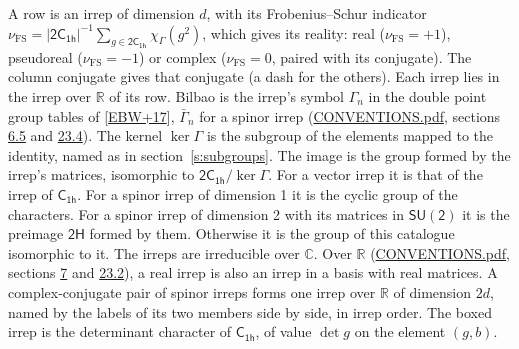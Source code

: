 \documentclass[10pt,a4paper]{article}
\numberwithin{equation}{section}
\newcommand{\grp}[1]{\mathsf{#1}}
\newcommand{\irchar}[1]{\chi_{#1}}
\newcommand{\fsind}{\nu_{\mathrm{FS}}}
\begin{document}
\leavevmode\label{n:index.frobenius}\label{n:head.irrep}\label{n:head.reality}A row is an irrep of dimension $d$, with its Frobenius--Schur indicator $\fsind = |\grp{2C_{1h}}|^{-1}\allowbreak\sum_{g\in\grp{2C_{1h}}}\irchar{\Gamma}(g^2)$, which gives its reality: real ($\fsind = +1$), pseudoreal ($\fsind = -1$) or complex ($\fsind = 0$, paired with its conjugate). \label{n:head.conjugate}The column conjugate gives that conjugate (a dash for the others). \label{n:head.over.real}Each irrep lies in the irrep over $\mathbb{R}$ of its row. \label{n:head.bilbao}\label{n:irrep.alias.gamma}Bilbao is the irrep's symbol $\Gamma_n$ in the double point group tables of [\href{../../../REFERENCES.pdf\#ref.EBW+17}{EBW+17}], $\bar{\Gamma}_n$ for a spinor irrep (\href{../../CONVENTIONS.pdf}{CONVENTIONS.pdf}, sections \href{../../../rotation/CONVENTIONS.pdf\#conv.6.5}{6.5} and \href{../../CONVENTIONS.pdf\#conv.23.4}{23.4}). \label{n:head.kernel}The kernel $\ker\Gamma$ is the subgroup of the elements mapped to the identity, named as in section~\ref{s:subgroups}. \label{n:head.image}The image is the group formed by the irrep's matrices, isomorphic to $\grp{2C_{1h}}/\ker\Gamma$. For a vector irrep it is that of the irrep of \href{../../../rotation/data/pdf/C1h.pdf}{$\grp{C_{1h}}$}. For a spinor irrep of dimension 1 it is the cyclic group of the characters. For a spinor irrep of dimension 2 with its matrices in $\grp{SU(2)}$ it is the preimage $\grp{2H}$ formed by them. Otherwise it is the group of this catalogue isomorphic to it. The irreps are irreducible over $\mathbb{C}$. Over $\mathbb{R}$ (\href{../../CONVENTIONS.pdf}{CONVENTIONS.pdf}, sections \href{../../../rotation/CONVENTIONS.pdf\#conv.7}{7} and \href{../../CONVENTIONS.pdf\#conv.23.2}{23.2}), a real irrep is also an irrep in a basis with real matrices. A complex-conjugate pair of spinor irreps forms one irrep over $\mathbb{R}$ of dimension $2d$, named by the labels of its two members side by side, in irrep order. \label{n:mark.determinant}The boxed irrep is the determinant character of \href{../../../rotation/data/pdf/C1h.pdf}{$\grp{C_{1h}}$}, of value $\det g$ on the element $(g, b)$.
\setlength{\emergencystretch}{2em}\par\setlength{\emergencystretch}{0pt}
\end{document}
